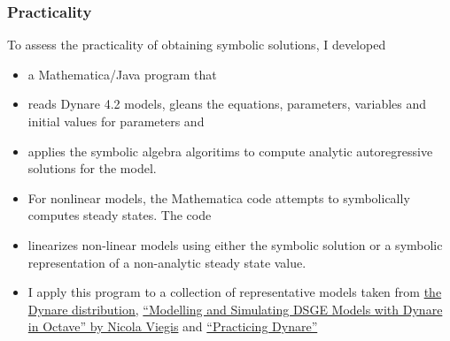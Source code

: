 \documentclass{beamer}
\begin{document}
  \begin{frame}
    \frametitle{Practicality}
    To assess the practicality of obtaining symbolic solutions, I developed
    \begin{itemize}
    \item a Mathematica/Java program that
    \item reads  Dynare 4.2 models, gleans the equations,  parameters, 
variables and   initial values for parameters and
\item 
applies the symbolic algebra algoritims to compute analytic 
autoregressive solutions for the model.
\item For nonlinear models, the Mathematica  code attempts to symbolically computes 
steady states. The code
\item linearizes non-linear models using either the symbolic solution or a 
symbolic representation of a non-analytic steady state value.
\end{itemize}
\end{frame}
\begin{frame}
\begin{itemize}
\item I apply this program to a collection of representative models taken from 
\href{http://www.dynare.org/documentation-and-support/faq/basics}{the Dynare distribution,}
\href{http://www.nviegi.net/research/dsge.htm}{``Modelling and Simulating DSGE Models with Dynare in Octave'' by Nicola Viegis} and 
\href{http://homepages.nyu.edu/~ts43/research/AP_tom16.pdf}{``Practicing Dynare''\cite{bhandari10}}
    \end{itemize}
  \end{frame}
\end{document}
